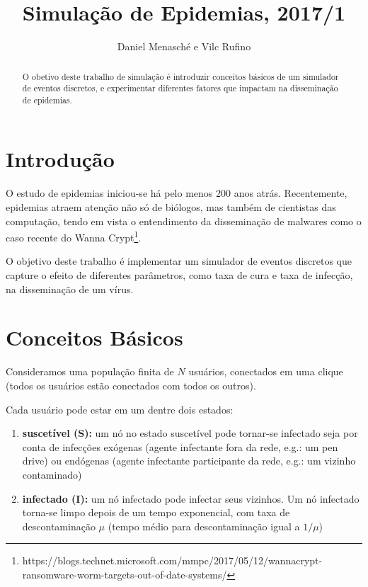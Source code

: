 \documentclass[a4paper]{article}
\title{Simulação de Epidemias, 2017/1}
\author{Daniel Menasché e Vilc Rufino}
\begin{document}
\maketitle

\begin{abstract}
O  obetivo deste trabalho de simulação é introduzir conceitos básicos de um simulador de eventos discretos, e experimentar diferentes fatores que impactam na disseminação de epidemias.
\end{abstract}

\section{Introdução}

O estudo de epidemias iniciou-se há pelo menos 200 anos atrás.  Recentemente, epidemias atraem atenção não só de biólogos, mas também de cientistas das computação, tendo em vista o entendimento da disseminação de malwares como o caso recente do 
Wanna Crypt\footnote{https://blogs.technet.microsoft.com/mmpc/2017/05/12/wannacrypt-ransomware-worm-targets-out-of-date-systems/}.

O objetivo deste trabalho é implementar um simulador de eventos discretos que capture o efeito de diferentes parâmetros, como taxa de cura e taxa de infecção, na disseminação de um vírus.

\section{Conceitos Básicos}

Consideramos uma população finita de $N$ usuários, conectados em uma clique (todos os usuários estão conectados com todos os outros).

Cada usuário pode estar em um dentre dois estados:
\begin{enumerate}
\item \textbf{suscetível (S):} um nó no estado suscetível pode tornar-se infectado seja por conta de infecções exógenas (agente infectante fora da rede, e.g.: um pen drive) ou endógenas (agente infectante participante da rede, e.g.: um vizinho contaminado)
\item \textbf{infectado (I):} um nó infectado pode infectar seus vizinhos.  Um nó infectado torna-se limpo depois de um tempo exponencial, com taxa de descontaminação $\mu$ (tempo médio para descontaminação igual a $1/\mu$)
\end{enumerate}
\end{document}
